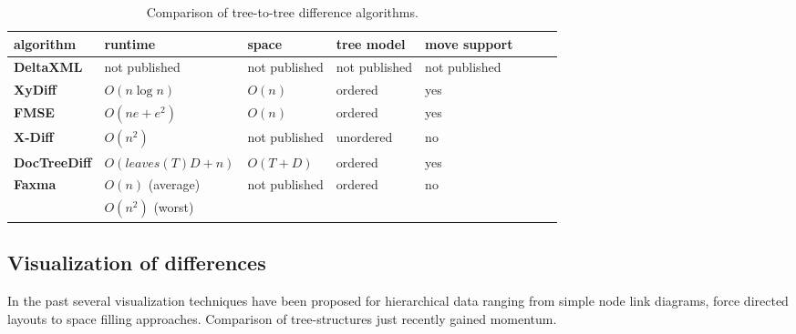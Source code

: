 \begin{table}[tb]
\begin{minipage}{\linewidth}
\centering 
\begin{tabularx}{0.9\textwidth}{|l|>{\centering\arraybackslash}X|>{\centering\arraybackslash}X|>{\centering\arraybackslash}X|>{\centering\arraybackslash}X|>{\centering\arraybackslash}X|>{\centering\arraybackslash}X|>{\centering\arraybackslash}X|} 
\hline
\textbf{algorithm} & \textbf{runtime} & \textbf{space} & \textbf{tree model} & \textbf{move support}\\
\hline
\hline
\textbf{DeltaXML} & not published & not published & not published & not published\\
\hline
\textbf{XyDiff} & $O(n \log n)$ & $O(n)$ & ordered & yes\\
\hline
\textbf{FMSE} & $O(n e + e^2)$ & $O(n)$ & ordered & yes\\
\hline
\textbf{X-Diff} & $O(n^2)$ & not published & unordered & no\\
\hline
\textbf{DocTreeDiff} & $O(leaves(T)D + n)$ & $O(T+D)$ & ordered & yes\\
\hline
\textbf{Faxma} & $O(n)$ (average) & not published & ordered & no\\
& $O(n^2)$ (worst) &  & & \\
\hline
\end{tabularx}
\label{chap2:Comparison}
\vspace{0.5em} 
\caption{Comparison of tree-to-tree difference algorithms.}
\end{minipage}
\end{table}

\subsection{Visualization of differences}
In the past several visualization techniques have been proposed for hierarchical data ranging from simple node link diagrams, force directed layouts to space filling approaches. Comparison of tree-structures just recently gained momentum. %


